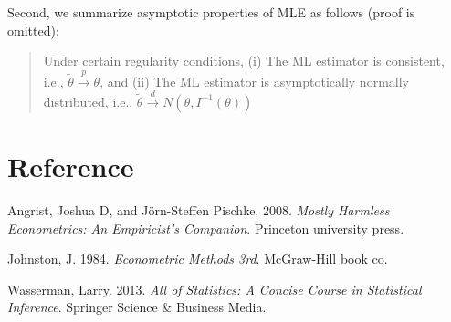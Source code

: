 \documentclass[
  12pt,
]{article}
\newlength{\cslhangindent}
\newenvironment{cslreferences}%
  {\setlength{\parindent}{0pt}%
  \everypar{\setlength{\hangindent}{\cslhangindent}}\ignorespaces}%
  {\par}
\begin{document}
Second, we summarize asymptotic properties of MLE as follows (proof is omitted):

\begin{quote}
Under certain regularity conditions,
(i) The ML estimator is consistent, i.e., \(\tilde{\theta} \overset{p}{\to} \theta\), and
(ii) The ML estimator is asymptotically normally distributed, i.e., \(\tilde{\theta} \overset{d}{\to} N(\theta, I^{-1}(\theta))\)
\end{quote}

\hypertarget{reference}{%
\section{Reference}\label{reference}}

\hypertarget{refs}{}
\begin{cslreferences}
\leavevmode\hypertarget{ref-angrist2008mostly}{}%
Angrist, Joshua D, and Jörn-Steffen Pischke. 2008. \emph{Mostly Harmless Econometrics: An Empiricist's Companion}. Princeton university press.

\leavevmode\hypertarget{ref-johnston1984econometric}{}%
Johnston, J. 1984. \emph{Econometric Methods 3rd}. McGraw-Hill book co.

\leavevmode\hypertarget{ref-wasserman2013all}{}%
Wasserman, Larry. 2013. \emph{All of Statistics: A Concise Course in Statistical Inference}. Springer Science \& Business Media.
\end{cslreferences}
\end{document}

